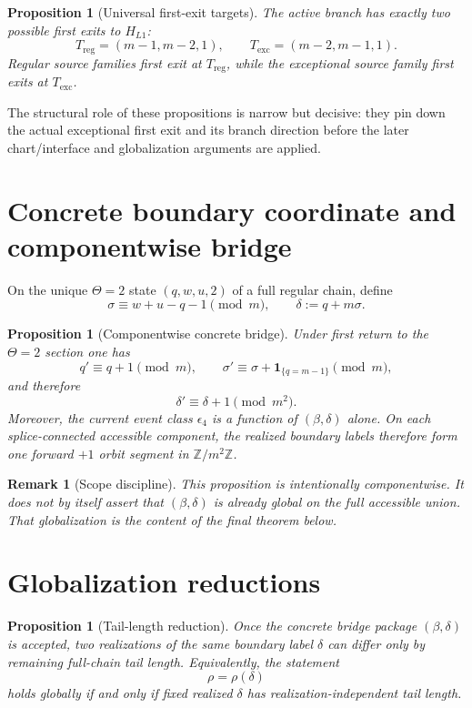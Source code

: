 \documentclass[11pt]{article}
\newtheorem{proposition}[theorem]{Proposition}
\newtheorem{remark}[theorem]{Remark}
\begin{document}
\begin{proposition}[Universal first-exit targets]
The active branch has exactly two possible first exits to $H_{L1}$:
\[
T_{\mathrm{reg}}=(m-1,m-2,1),
\qquad
T_{\mathrm{exc}}=(m-2,m-1,1).
\]
Regular source families first exit at $T_{\mathrm{reg}}$, while the exceptional
source family first exits at $T_{\mathrm{exc}}$.
\end{proposition}

The structural role of these propositions is narrow but decisive: they pin down
the actual exceptional first exit and its branch direction before the later
chart/interface and globalization arguments are applied.

\section{Concrete boundary coordinate and componentwise bridge}

On the unique $\Theta=2$ state $(q,w,u,2)$ of a full regular chain, define
\[
\sigma \equiv w + u - q - 1 \pmod m,
\qquad
\delta := q + m\sigma.
\]

\begin{proposition}[Componentwise concrete bridge]
Under first return to the $\Theta=2$ section one has
\[
q' \equiv q+1 \pmod m,
\qquad
\sigma' \equiv \sigma + \mathbf 1_{\{q=m-1\}} \pmod m,
\]
and therefore
\[
\delta' \equiv \delta+1 \pmod{m^2}.
\]
Moreover, the current event class $\epsilon_4$ is a function of
$(\beta,\delta)$ alone. On each splice-connected accessible component, the
realized boundary labels therefore form one forward $+1$ orbit segment in
$\mathbb Z/m^2\mathbb Z$.
\end{proposition}

\begin{remark}[Scope discipline]
This proposition is intentionally \emph{componentwise}. It does not by itself
assert that $(\beta,\delta)$ is already global on the full accessible union.
That globalization is the content of the final theorem below.
\end{remark}

\section{Globalization reductions}

\begin{proposition}[Tail-length reduction]
Once the concrete bridge package $(\beta,\delta)$ is accepted, two realizations
of the same boundary label $\delta$ can differ only by remaining full-chain tail
length. Equivalently, the statement
\[
\rho = \rho(\delta)
\]
holds globally if and only if fixed realized $\delta$ has realization-independent
tail length.
\end{proposition}
\end{document}
